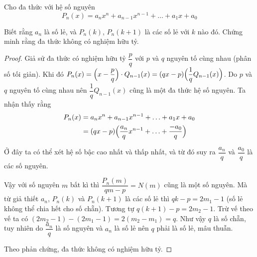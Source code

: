 \begin{problem}{10}
    Cho đa thức với hệ số nguyên
    \[P_n(x) = a_n x^n + a_{n-1} x^{n-1} + \ldots + a_1 x + a_0\]

    Biết rằng $a_n$ là số lẻ, và $P_n(k)$, $P_n(k+1)$ là các số
    lẻ với $k$ nào đó. Chứng minh rằng đa thức không có nghiệm hữu tỷ.
\end{problem}

\begin{proof}
    Giả sử đa thức có nghiệm hữu tỷ $\dfrac{p}{q}$ với $p$ và $q$
    nguyên tố cùng nhau (phân số tối giản). Khi đó 
    $P_n(x) = \Bigl(x - \dfrac{p}{q}\Bigr) \cdot Q_{n-1}(x)
    = (qx - p) \Bigl(\dfrac{1}{q} Q_{n-1}(x)\Bigr)$.
    Do $p$ và $q$ nguyên tố cùng nhau nên $\dfrac{1}{q} Q_{n-1}(x)$
    cũng là một đa thức hệ số nguyên. Ta nhận thấy rằng
    \begin{align*}
        P_n(x) & = a_n x^n + a_{n-1} x^{n-1} + \ldots + a_1 x + a_0 \\
    & = (qx - p) \Bigl(\dfrac{a_n}{q} x^{n-1} + \ldots + \dfrac{-a_0}{q}\Bigr)
    \end{align*}
    
    Ở đây ta có thể xét hệ số bậc cao nhất và thấp nhất, và từ
    đó suy ra $\dfrac{a_n}{q}$ và $\dfrac{a_0}{q}$ là các số nguyên.

    Vậy với số nguyên $m$ bất kì thì $\dfrac{P_n(m)}{qm - p} = N(m)$
    cũng là một số nguyên. Mà từ giả thiết $a_n$, $P_n(k)$ và 
    $P_n(k+1)$ là các số lẻ thì $qk - p = 2m_1 - 1$ (số lẻ không
    thể chia hết cho số chẵn). Tương tự $q(k+1) - p = 2m_2 - 1$.
    Trừ vế theo vế ta có $(2m_2 - 1) - (2m_1 - 1) = 
    2 (m_2 - m_1) = q$. Như vậy $q$ là số chẵn, tuy nhiên do 
    $\dfrac{a_n}{q}$ là số nguyên và $a_n$ là số lẻ nên $q$ 
    phải là số lẻ, mâu thuẫn. 

    Theo phản chứng, đa thức không có nghiệm hữu tỷ.
\end{proof}